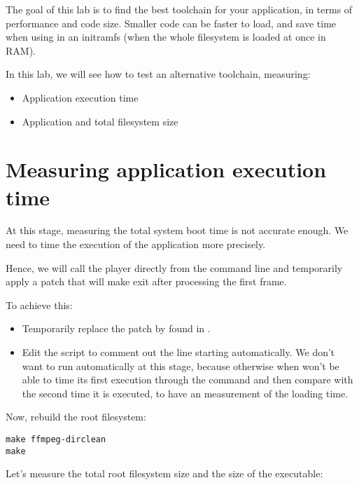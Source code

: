 
The goal of this lab is to find the best toolchain for your application,
in terms of performance and code size. Smaller code can be faster to
load, and save time when using in an initramfs (when the whole
filesystem is loaded at once in RAM).

In this lab, we will see how to test an alternative toolchain, measuring:
\begin{itemize}
 \item Application execution time
 \item Application and total filesystem size
\end{itemize}

\section{Measuring application execution time}

At this stage, measuring the total system boot time is not accurate
enough. We need to time the execution of the application more precisely.

Hence, we will call the  player directly from the command
line and temporarily apply a patch that will make 
exit after processing the first frame.

To achieve this:
\begin{itemize}
\item Temporarily replace the
 patch
by  found in
.
\item Edit the  script to comment out the line
starting  automatically. We don't want  to run
automatically at this stage, because otherwise when won't be able to
time its first execution through the  command and then
compare with the second time it is executed, to have an measurement of
the  loading time.
\end{itemize}

Now, rebuild the root filesystem:
\begin{verbatim}
make ffmpeg-dirclean
make
\end{verbatim}

Let's measure the total root filesystem size and the size of the
 executable:

